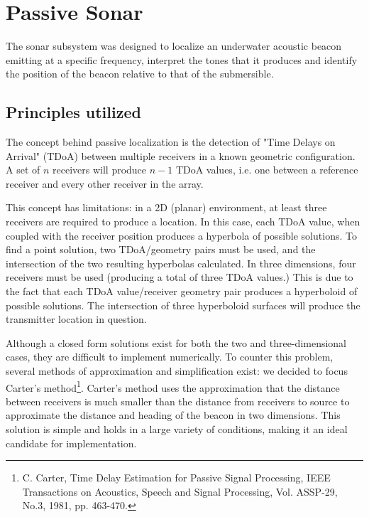 \section{Passive Sonar}


The sonar subsystem was designed to localize an underwater acoustic beacon emitting at a specific frequency, interpret the tones that it produces and identify the position of the beacon relative to that of the submersible.

\subsection{Principles utilized}

The concept behind passive localization is the detection of "Time
Delays on Arrival" (TDoA) between multiple receivers in a known
geometric configuration. A set of $n$ receivers will produce $n-1$
TDoA values, i.e. one between a reference receiver and every other
receiver in the array.

This concept has limitations: in a 2D (planar) environment, at least
three receivers are required to produce a location. In this case, each
TDoA value, when coupled with the receiver position produces a
hyperbola of possible solutions. To find a point solution, two
TDoA/geometry pairs must be used, and the intersection of the two
resulting hyperbolas calculated. In three dimensions, four receivers
must be used (producing a total of three TDoA values.) This is due to
the fact that each TDoA value/receiver geometry pair produces a
hyperboloid of possible solutions. The intersection of three
hyperboloid surfaces will produce the transmitter location in
question.

Although a closed form solutions exist for both the two and
three-dimensional cases, they are difficult to implement numerically.
To counter this problem, several methods of approximation and
simplification exist: we decided to focus Carter's method\footnote{C. Carter,
  Time Delay Estimation for Passive Signal Processing, IEEE
  Transactions on Acoustics, Speech and Signal Processing, Vol.
  ASSP-29, No.3, 1981, pp. 463-470.}. Carter's method uses the
approximation that the distance between receivers is much smaller than
the distance from receivers to source to approximate the distance and
heading of the beacon in two dimensions. This solution is simple and
holds in a large variety of conditions, making it an ideal candidate
for implementation.


